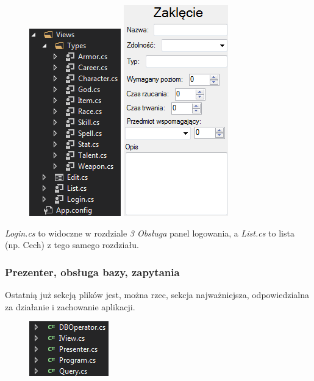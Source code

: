 \documentclass{article}
\begin{document}
\begin{figure}[h!]
\begin{center}
    
\centering
\includegraphics[]{views1.png}\hfill
\includegraphics[]{kontrolka1.png}

\end{center}
\end{figure}
\textit{Login.cs} to widoczne w rozdziale \textit{3 Obsługa} panel logowania, a \textit{List.cs} to lista (np. Cech) z tego samego rozdziału.

\subsubsection*{Prezenter, obsługa bazy, zapytania}
Ostatnią już sekcją plików jest, można rzec, sekcja najważniejsza, odpowiedzialna za działanie i zachowanie aplikacji.

\begin{figure}[h!]
\begin{center}
    
\centering
\includegraphics[]{pliki1.png}

\end{center}
\end{figure}
\end{document}
